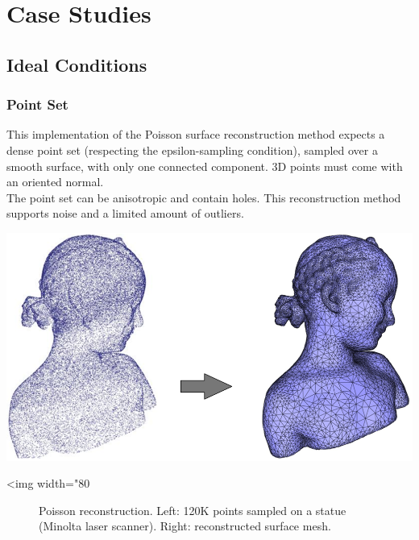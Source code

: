 \section{Case Studies}
\label{surface_reconstruction_section_case_studies}

\subsection{Ideal Conditions}

\subsubsection{Point Set}

This implementation of the Poisson surface reconstruction method expects a dense point set (respecting the epsilon-sampling condition), sampled over a smooth surface, with only one connected component. 3D points must come with an oriented normal.\\
The point set can be anisotropic and contain holes. This reconstruction method supports noise and a limited amount of outliers.

\begin{center}
    \label{Surface_reconstruction_points_3-fig-bimba}
    \begin{ccTexOnly}
      \includegraphics[width=1.0\textwidth]{Surface_reconstruction_points_3/bimba} %
    \end{ccTexOnly}
    \begin{ccHtmlOnly}
        <img width="80%
    \end{ccHtmlOnly}
    \begin{figure}[h]
        \caption{Poisson reconstruction.
                 Left: 120K points sampled on a statue (Minolta laser scanner).
                 Right: reconstructed surface mesh.}
    \end{figure}
\end{center}

